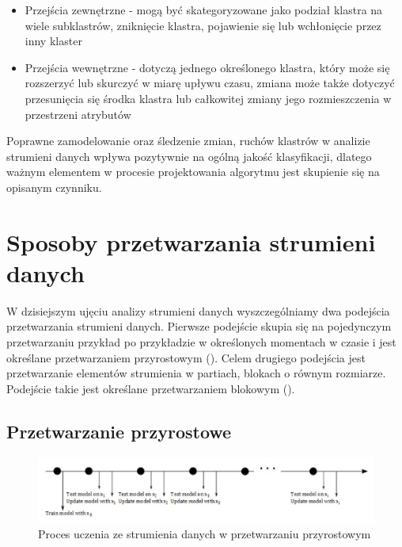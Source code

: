 \begin{itemize}
    \item Przejścia zewnętrzne - mogą być skategoryzowane jako podział klastra na wiele subklastrów, zniknięcie klastra, pojawienie się lub wchłonięcie przez inny klaster
    \item Przejścia wewnętrzne - dotyczą jednego określonego klastra, który może się rozszerzyć lub skurczyć w miarę upływu czasu, zmiana może także dotyczyć przesunięcia się środka klastra lub całkowitej zmiany jego rozmieszczenia w przestrzeni atrybutów
\end{itemize}

\noindent Poprawne zamodelowanie oraz śledzenie zmian, ruchów klastrów w analizie strumieni danych wpływa pozytywnie na ogólną jakość klasyfikacji, dlatego ważnym elementem w procesie projektowania algorytmu jest skupienie się na opisanym czynniku.

\section{Sposoby przetwarzania strumieni danych}

\noindent W dzisiejszym ujęciu analizy strumieni danych wyszczególniamy dwa podejścia przetwarzania strumieni danych. Pierwsze podejście skupia się na pojedynczym przetwarzaniu przykład po przykładzie w określonych momentach w czasie i jest określane przetwarzaniem przyrostowym (). Celem drugiego podejścia jest przetwarzanie elementów strumienia w partiach, blokach o równym rozmiarze. Podejście takie jest określane przetwarzaniem blokowym ().

\subsection{Przetwarzanie przyrostowe}

\begin{figure}[h] 
    \centering
    \includegraphics[width=15cm]{figures/online_processing.JPG}
    \caption{Proces uczenia ze strumienia danych w przetwarzaniu przyrostowym \cite{BrzezPhd2015}}\label{Figure:OnlineProcessing}
\end{figure}

